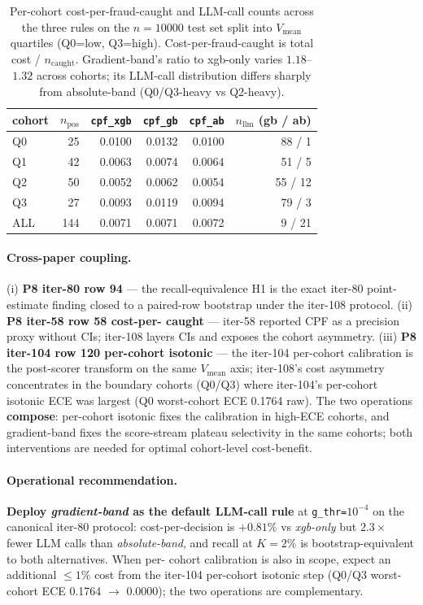 \documentclass{article}
\begin{document}
\begin{table}[t]
\centering
\caption{Per-cohort cost-per-fraud-caught and LLM-call counts across
the three rules on the $n{=}10000$ test set split into $V_\mathrm{mean}$
quartiles (Q0=low, Q3=high). Cost-per-fraud-caught is total cost /
$n_\mathrm{caught}$. Gradient-band's ratio to xgb-only varies $1.18$--$1.32$
across cohorts; its LLM-call distribution differs sharply from absolute-band
(Q0/Q3-heavy vs Q2-heavy).}
\label{tab:p8-cost-cohort}
\small
\begin{tabular}{lrrrrr}
\toprule
cohort & $n_\mathrm{pos}$ & \texttt{cpf\_xgb} & \texttt{cpf\_gb} & \texttt{cpf\_ab} &
$n_\mathrm{llm}$ (gb / ab) \\
\midrule
Q0 & 25 & 0.0100 & 0.0132 & 0.0100 & 88 / 1 \\
Q1 & 42 & 0.0063 & 0.0074 & 0.0064 & 51 / 5 \\
Q2 & 50 & 0.0052 & 0.0062 & 0.0054 & 55 / 12 \\
Q3 & 27 & 0.0093 & 0.0119 & 0.0094 & 79 / 3 \\
\midrule
ALL & 144 & 0.0071 & 0.0071 & 0.0072 & 9 / 21 \\
\bottomrule
\end{tabular}
\end{table}

\paragraph{Cross-paper coupling.}
(i) \textbf{P8 iter-80 row 94} --- the recall-equivalence H1 is the
exact iter-80 point-estimate finding closed to a paired-row bootstrap
under the iter-108 protocol. (ii) \textbf{P8 iter-58 row 58 cost-per-
caught} --- iter-58 reported CPF as a precision proxy without CIs;
iter-108 layers CIs and exposes the cohort asymmetry. (iii)
\textbf{P8 iter-104 row 120 per-cohort isotonic} --- the iter-104
per-cohort calibration is the post-scorer transform on the same
$V_\mathrm{mean}$ axis; iter-108's cost asymmetry concentrates in the
boundary cohorts (Q0/Q3) where iter-104's per-cohort isotonic ECE was
largest (Q0 worst-cohort ECE 0.1764 raw). The two operations
\textbf{compose}: per-cohort isotonic fixes the calibration in
high-ECE cohorts, and gradient-band fixes the score-stream plateau
selectivity in the same cohorts; both interventions are needed for
optimal cohort-level cost-benefit.

\paragraph{Operational recommendation.}
\textbf{Deploy \textit{gradient-band} as the default LLM-call rule} at
\texttt{g\_thr=}$10^{-4}$ on the canonical iter-80 protocol:
cost-per-decision is $+0.81\%$ vs \textit{xgb-only} but
$2.3\times$ fewer LLM calls than \textit{absolute-band}, and recall
at $K{=}2\%$ is bootstrap-equivalent to both alternatives. When per-
cohort calibration is also in scope, expect an additional $\le 1\%$
cost from the iter-104 per-cohort isotonic step (Q0/Q3 worst-cohort
ECE 0.1764 $\to$ 0.0000); the two operations are complementary.
\end{document}

